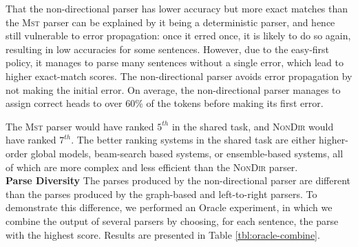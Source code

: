 \documentclass[11pt]{article}
\begin{document}
That the non-directional parser has lower accuracy but more exact matches than the \textsc{Mst} parser can be explained by it being a deterministic parser, and hence still vulnerable to error propagation: once it erred once, it is likely to do so again, resulting in low accuracies for some sentences.  However, due to the easy-first policy, it manages to parse many sentences without a single error, which lead to higher exact-match scores.  The non-directional parser avoids error propagation by not making the initial error.  On average, the non-directional parser manages to assign correct heads to over 60\% of the tokens before making its first error.  

The \textsc{Mst} parser would have ranked $5^{th}$ in the shared task, and \textsc{NonDir} would have ranked $7^{th}$.  The better ranking systems in the shared task are either higher-order global models, beam-search based systems, or ensemble-based systems, all of which are more complex and less efficient than the \textsc{NonDir} parser.\\  %
\textbf{Parse Diversity}
The parses produced by the non-directional parser are different than the parses produced by the graph-based and left-to-right parsers.   To demonstrate this difference, we performed an Oracle experiment, in which we combine the output of several parsers by choosing, for each sentence, the parse with the highest score.  Results are presented in Table \ref{tbl:oracle-combine}.
\end{document}
